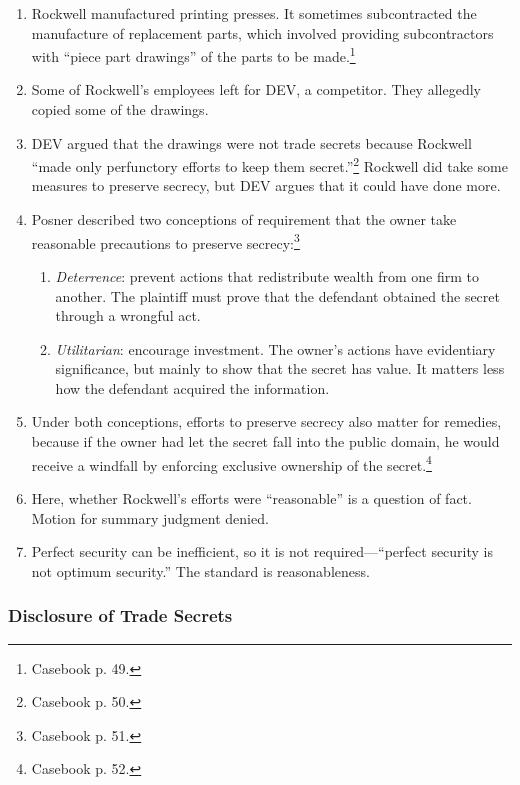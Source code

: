 
\begin{enumerate}
    \item Rockwell manufactured printing presses. It sometimes subcontracted 
    the manufacture of replacement parts, which involved providing 
    subcontractors with ``piece part drawings'' of the parts to be 
    made.\footnote{Casebook p. 49.}
    \item Some of Rockwell's employees left for DEV, a competitor. They 
    allegedly copied some of the drawings.
    \item DEV argued that the drawings were not trade secrets because Rockwell 
    ``made only perfunctory efforts to keep them secret.''\footnote{Casebook 
    p. 50.} Rockwell did take some measures to preserve secrecy, but DEV 
    argues that it could have done more.
    \item Posner described two conceptions of requirement that the owner take 
    reasonable precautions to preserve secrecy:\footnote{Casebook p. 51.}
    \begin{enumerate}
        \item \emph{Deterrence}: prevent actions that redistribute wealth from 
        one firm to another. The plaintiff must prove that the defendant 
        obtained the secret through a wrongful act.
        \item \emph{Utilitarian}: encourage investment. The owner's actions 
        have evidentiary significance, but mainly to show that the secret has 
        value. It matters less how the defendant acquired the information.
    \end{enumerate}
    \item Under both conceptions, efforts to preserve secrecy also matter for 
    remedies, because if the owner had let the secret fall into the public 
    domain, he would receive a windfall by enforcing exclusive ownership of 
    the secret.\footnote{Casebook p. 52.}
    \item Here, whether Rockwell's efforts were ``reasonable'' is a question 
    of fact. Motion for summary judgment denied.
    \item Perfect security can be inefficient, so it is not 
    required---``perfect security is not optimum security.'' The standard is 
    reasonableness.
\end{enumerate}

\subsubsection{Disclosure of Trade Secrets}

